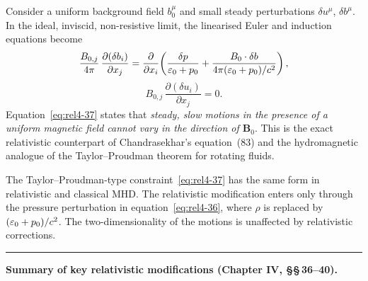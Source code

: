 Consider a uniform background field $b^{\mu}_{0}$ and small steady
perturbations $\delta u^{\mu}$, $\delta b^{\mu}$.  In the ideal,
inviscid, non-resistive limit, the linearised Euler and induction equations
become
\begin{equation}\label{eq:rel4-36}
  \frac{B_{0,j}}{4\pi}\,\frac{\partial(\delta b_{i})}{\partial x_{j}}
  = \frac{\partial}{\partial x_{i}}
    \!\left(\frac{\delta p}{\varepsilon_{0}+p_{0}}
    +\frac{B_{0}\cdot\delta b}{4\pi(\varepsilon_{0}+p_{0})/c^{2}}\right),
\end{equation}
\begin{equation}\label{eq:rel4-37}
  B_{0,j}\,\frac{\partial(\delta u_{i})}{\partial x_{j}} = 0.
\end{equation}
Equation~\eqref{eq:rel4-37} states that \emph{steady, slow motions in the
presence of a uniform magnetic field cannot vary in the direction of
$\mathbf{B}_{0}$}.  This is the exact relativistic counterpart of
Chandrasekhar's equation~(83) and the hydromagnetic analogue of the
Taylor--Proudman theorem for rotating fluids.

\begin{relcorrection}
The Taylor--Proudman-type constraint~\eqref{eq:rel4-37} has the same
form in relativistic and classical MHD.  The relativistic modification
enters only through the pressure perturbation
in equation~\eqref{eq:rel4-36}, where $\rho$ is replaced by
$(\varepsilon_{0}+p_{0})/c^{2}$.  The two-dimensionality of the motions
is unaffected by relativistic corrections.
\end{relcorrection}


\bigskip
\noindent\rule{\textwidth}{0.4pt}
\medskip
\noindent\textbf{Summary of key relativistic modifications
(Chapter IV, \S\S\,36--40).}

